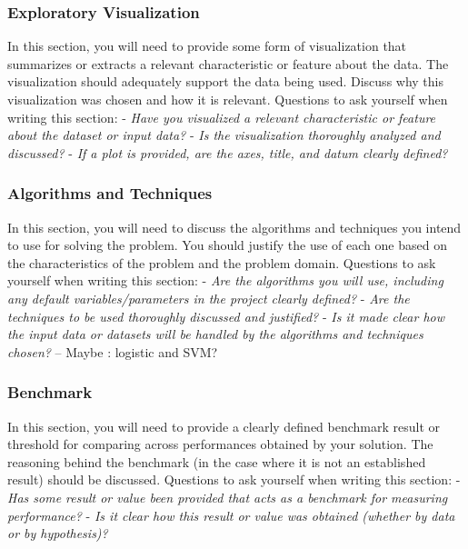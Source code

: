 \documentclass[]{article}
\begin{document}
\subsubsection{Exploratory
Visualization}\label{exploratory-visualization}

In this section, you will need to provide some form of visualization
that summarizes or extracts a relevant characteristic or feature about the data. The visualization should adequately support the data being used. Discuss why this visualization was chosen and how it is relevant. Questions to ask yourself when writing this section: - \emph{Have you visualized a relevant characteristic or feature about the dataset or input data?} - \emph{Is the visualization thoroughly analyzed and discussed?} - \emph{If a plot is provided, are the axes, title, and datum clearly defined?}

\subsubsection{Algorithms and
Techniques}\label{algorithms-and-techniques}

In this section, you will need to discuss the algorithms and techniques you intend to use for solving the problem. You should justify the use of each one based on the characteristics of the problem and the problem domain. Questions to ask yourself when writing this section: - \emph{Are the algorithms you will use, including any default variables/parameters in the project clearly defined?} - \emph{Are the techniques to be used thoroughly discussed and justified?} - \emph{Is it made clear how the input data or datasets will be handled by the algorithms and techniques
chosen?}
-- Maybe : logistic and SVM?

\subsubsection{Benchmark}\label{benchmark}

In this section, you will need to provide a clearly defined benchmark result or threshold for comparing across performances obtained by your solution. The reasoning behind the benchmark (in the case where it is not an established result) should be discussed. Questions to ask yourself when writing this section: - \emph{Has some result or value been provided that acts as a benchmark for measuring performance?} - \emph{Is it clear how this result or value was obtained (whether by data or by hypothesis)?}
\end{document}
